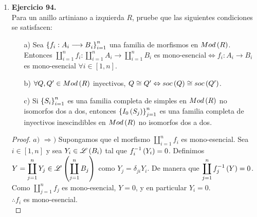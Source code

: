 \documentclass{article}
\begin{document}
\begin{enumerate}
\begin{proof}
		Finalmente, puesto que $\mathbb{Z}$ es irreducible y que $\mathbb{Z}\subseteq\mathbb{Q}$ es mono-esencial, se satisface la \textbf{Proposición 3.3.7.d)}. $\therefore\mathbb{Q}$ es inyectivo e inescindible.\\
		
		$\boxed{\text{b)}}$ Sea $0 \neq M \leq Q$. Por la \textbf{Proposición 3.3.5.c)}, $I_{0}\lrprth{M}\leq\mathbb{Q}$. Como $I_{0}\lrprth{M}$ es inyectivo, existe $K\leq\mathbb{Q}$ tal que $\mathbb{Q} \cong K \oplus I_{0}\lrprth{M}$. Dado que $\mathbb{Q}$ es inescindible, $K=0$. $\therefore I_{0}\lrprth{M}\cong\mathbb{Q}$
	\end{proof}
	
	\item \textbf{Ejercicio 94.}\\
	Para un anillo artiniano a izquierda $R$, pruebe que las siguientes condiciones se satisfacen:
	\begin{enumerate}
		\item[a)] Sea ${\left\{{f_{i}:A_{i} \longrightarrow B}_{i}\right\}}_{i=1}^{n}$ una familia de morfismos en $Mod\left(R\right)$. Entonces $\displaystyle\coprod_{i=1}^{n}f_{i}:\displaystyle\coprod_{i=1}^{n}A_{i}\longrightarrow\displaystyle\coprod_{i=1}^{n}B_{i}$ es mono-esencial$\Leftrightarrow f_{i}:A_{i} \longrightarrow B_{i}$ es mono-esencial $\forall i \in [1,n]$.
		\item[b)] $\forall Q,Q'\in Mod\left(R\right)$ inyectivos, $Q \cong Q' \Leftrightarrow soc\left(Q\right) \cong soc\left(Q'\right)$.
		\item[c)] Si ${\left\{{S}_{i}\right\}}_{i=1}^{n}$ es una familia completa de simples en $Mod\left(R\right)$ no isomorfos dos a dos, entonces $\left\{I_{0}\left(S_{j}\right)\right\}_{j=1}^{n}$ es una familia completa de inyectivos inescindibles en $Mod\left(R\right)$ no isomorfos dos a dos.
	\end{enumerate}
	\begin{proof}
		$\boxed{a)}$ $\boxed{\Rightarrow )}$ Supongamos que el morfismo $\displaystyle\coprod_{i=1}^{n}f_{i}$ es mono-esencial. Sea $i \in [1,n]$ y sea $Y_{i}\in\mathscr{L}\left(B_{i}\right)$ tal que $f_{i}^{-1}\left(Y_{i}\right)=0$. Definimos $Y=\displaystyle\coprod_{j=1}^{n}Y_{j}\in\mathscr{L}\left(\displaystyle\coprod_{j=1}^{n}B_{j}\right)$ como $Y_{j}=\delta_{ji}Y_{i}$. De manera que $\displaystyle\coprod_{j=1}^{n}f_{j}^{-1}\left(Y\right)=0$. Como $\displaystyle\coprod_{j=1}^{n}f_{j}$ es mono-esencial, $Y=0$, y en particular $Y_{i}=0$.\\
		$\therefore f_{i}$ es mono-esencial.\\
		

\end{proof}
\end{enumerate}
\end{document}
